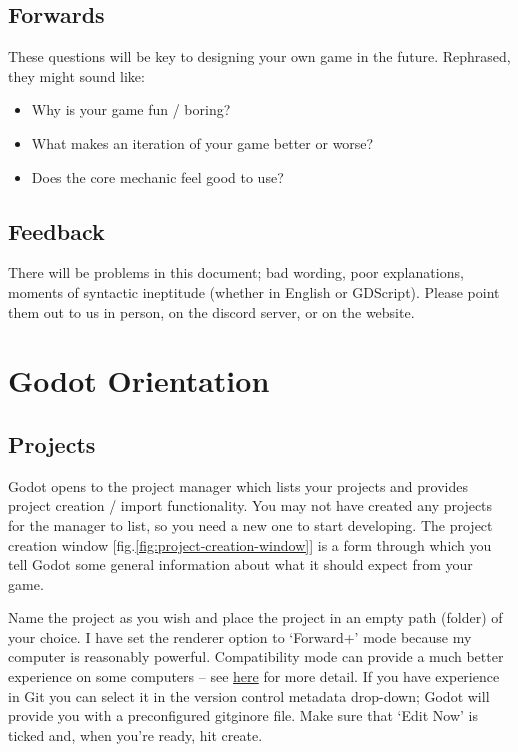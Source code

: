 \documentclass[14pt]{extarticle}
\newcommand{\prettyref}[2]{[{#1}.\ref{#2}]}
\begin{document}
\subsection*{Forwards}
These questions will be key to designing your own game in the future. Rephrased, they might sound like:
\begin{itemize}
  \item[--] Why is your game fun / boring?
  \item[--] What makes an iteration of your game better or worse?
  \item[--] Does the core mechanic feel good to use?
\end{itemize}

\subsection*{Feedback}
There will be problems in this document; bad wording, poor explanations, moments of syntactic ineptitude (whether in English or GDScript). Please point them out to us in person, on the discord server, or on the website.

\clearpage
\section{Godot Orientation}
\subsection*{Projects}
Godot opens to the project manager which lists your projects and provides project creation / import functionality. You may not have created any projects for the manager to list, so you need a new one to start developing. The project creation window \prettyref{fig}{fig:project-creation-window} is a form through which you tell Godot some general information about what it should expect from your game.


Name the project as you wish and place the project in an empty path (folder) of your choice. I have set the renderer option to `Forward+' mode because my computer is reasonably powerful. Compatibility mode can provide a much better experience on some computers -- see \href{https://docs.godotengine.org/en/stable/tutorials/rendering/renderers.html}{here} for more detail. If you have experience in Git you can select it in the version control metadata drop-down; Godot will provide you with a preconfigured gitginore file. Make sure that `Edit Now' is ticked and, when you're ready, hit create.
\end{document}

